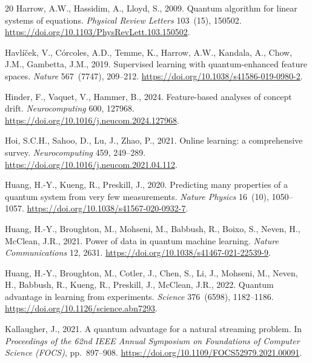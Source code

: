 \documentclass[preprint,12pt,authoryear]{elsarticle}
\begin{document}
\begin{thebibliography}{20}
Harrow, A.W., Hassidim, A., Lloyd, S., 2009.
\newblock Quantum algorithm for linear systems of equations.
\newblock \emph{Physical Review Letters} 103~(15), 150502.
\newblock \url{https://doi.org/10.1103/PhysRevLett.103.150502}.

Havl\'i\v{c}ek, V., C\'orcoles, A.D., Temme, K., Harrow, A.W., Kandala, A., Chow, J.M., Gambetta, J.M., 2019.
\newblock Supervised learning with quantum-enhanced feature spaces.
\newblock \emph{Nature} 567~(7747), 209--212.
\newblock \url{https://doi.org/10.1038/s41586-019-0980-2}.

Hinder, F., Vaquet, V., Hammer, B., 2024.
\newblock Feature-based analyses of concept drift.
\newblock \emph{Neurocomputing} 600, 127968.
\newblock \url{https://doi.org/10.1016/j.neucom.2024.127968}.

Hoi, S.C.H., Sahoo, D., Lu, J., Zhao, P., 2021.
\newblock Online learning: a comprehensive survey.
\newblock \emph{Neurocomputing} 459, 249--289.
\newblock \url{https://doi.org/10.1016/j.neucom.2021.04.112}.

Huang, H.-Y., Kueng, R., Preskill, J., 2020.
\newblock Predicting many properties of a quantum system from very few measurements.
\newblock \emph{Nature Physics} 16~(10), 1050--1057.
\newblock \url{https://doi.org/10.1038/s41567-020-0932-7}.

Huang, H.-Y., Broughton, M., Mohseni, M., Babbush, R., Boixo, S., Neven, H., McClean, J.R., 2021.
\newblock Power of data in quantum machine learning.
\newblock \emph{Nature Communications} 12, 2631.
\newblock \url{https://doi.org/10.1038/s41467-021-22539-9}.

Huang, H.-Y., Broughton, M., Cotler, J., Chen, S., Li, J., Mohseni, M., Neven, H., Babbush, R., Kueng, R., Preskill, J., McClean, J.R., 2022.
\newblock Quantum advantage in learning from experiments.
\newblock \emph{Science} 376~(6598), 1182--1186.
\newblock \url{https://doi.org/10.1126/science.abn7293}.

Kallaugher, J., 2021.
\newblock A quantum advantage for a natural streaming problem.
\newblock In \emph{Proceedings of the 62nd IEEE Annual Symposium on Foundations of Computer Science (FOCS)}, pp.~897--908.
\newblock \url{https://doi.org/10.1109/FOCS52979.2021.00091}.


\end{thebibliography}
\end{document}
